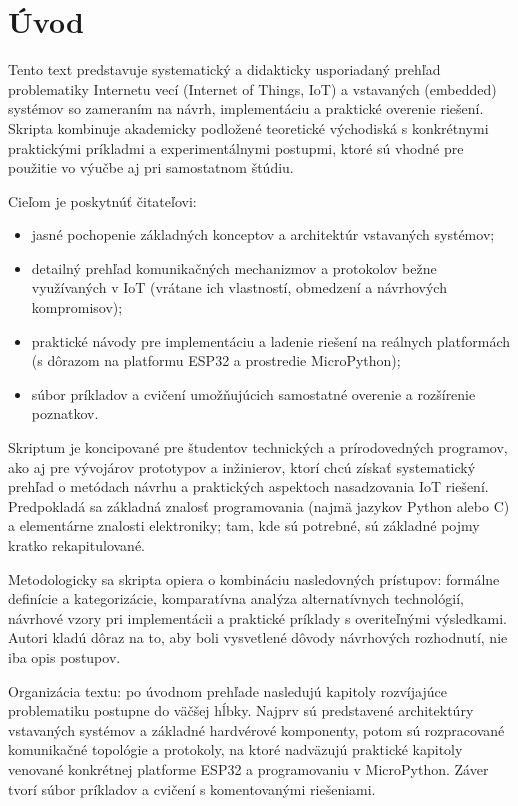 
\section{Úvod}

Tento text predstavuje systematický a didakticky usporiadaný prehľad problematiky Internetu vecí (Internet of Things, IoT) a vstavaných (embedded) systémov so zameraním na návrh, implementáciu a praktické overenie riešení. Skripta kombinuje akademicky podložené teoretické východiská s konkrétnymi praktickými príkladmi a experimentálnymi postupmi, ktoré sú vhodné pre použitie vo výučbe aj pri samostatnom štúdiu.

Cieľom je poskytnúť čitateľovi:
\begin{itemize}
	\item jasné pochopenie základných konceptov a architektúr vstavaných systémov;
	\item detailný prehľad komunikačných mechanizmov a protokolov bežne využívaných v IoT (vrátane ich vlastností, obmedzení a návrhových kompromisov);
	\item praktické návody pre implementáciu a ladenie riešení na reálnych platformách (s dôrazom na platformu ESP32 a prostredie MicroPython);
	\item súbor príkladov a cvičení umožňujúcich samostatné overenie a rozšírenie poznatkov.
\end{itemize}

Skriptum je koncipované pre študentov technických a prírodovedných programov, ako aj pre vývojárov prototypov a inžinierov, ktorí chcú získať systematický prehľad o metódach návrhu a praktických aspektoch nasadzovania IoT riešení. Predpokladá sa základná znalosť programovania (najmä jazykov Python alebo C) a elementárne znalosti elektroniky; tam, kde sú potrebné, sú základné pojmy kratko rekapitulované.

Metodologicky sa skripta opiera o kombináciu nasledovných prístupov: formálne definície a kategorizácie, komparatívna analýza alternatívnych technológií, návrhové vzory pri implementácii a praktické príklady s overiteľnými výsledkami. Autori kladú dôraz na to, aby boli vysvetlené dôvody návrhových rozhodnutí, nie iba opis postupov.

Organizácia textu: po úvodnom prehľade nasledujú kapitoly rozvíjajúce problematiku postupne do väčšej hĺbky. Najprv sú predstavené architektúry vstavaných systémov a základné hardvérové komponenty, potom sú rozpracované komunikačné topológie a protokoly, na ktoré nadväzujú praktické kapitoly venované konkrétnej platforme ESP32 a programovaniu v MicroPython. Záver tvorí súbor príkladov a cvičení s komentovanými riešeniami.

